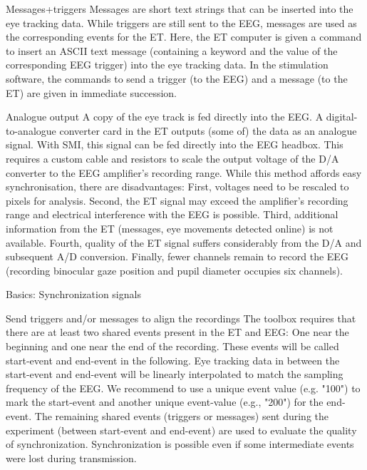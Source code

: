 Messages+triggers
Messages are short text strings that can be inserted into the eye tracking data.
 While triggers are still sent to the EEG, messages are used as the corresponding 
 events for the ET. Here, the ET computer is given a command to insert an ASCII text 
 message (containing a keyword and the value of the corresponding EEG trigger) 
 into the eye tracking data. In the stimulation software, the commands to send a trigger
  (to the EEG) and a message (to the ET) are given in immediate succession. 

  Analogue output
  A copy of the eye track is fed directly into the EEG. A digital-to-analogue 
  converter card in the ET outputs (some of) the data as an analogue signal.
   With SMI, this signal can be fed directly into the EEG headbox. 
   This requires a custom cable and resistors to scale the output voltage 
   of the D/A converter to the EEG amplifier's recording range. While this
    method affords easy synchronisation, there are disadvantages: First, 
    voltages need to be rescaled to pixels for analysis. Second, the ET 
    signal may exceed the amplifier’s recording range and electrical 
    interference with the EEG is possible. 
    Third, additional information from the ET 
    (messages, eye movements detected online) is 
    not available. Fourth, quality of the ET signal 
    suffers considerably from the D/A and subsequent 
    A/D conversion. Finally, fewer channels remain to record
     the EEG (recording binocular gaze position and pupil diameter occupies six channels).

     Basics: Synchronization signals

     Send triggers and/or messages to align the recordings
The toolbox requires that there are at least two shared events present in the ET and EEG: One near the beginning and one near the end of the recording. These events will be called start-event and end-event in the following. Eye tracking data in between the start-event and end-event will be linearly interpolated to match the sampling frequency of the EEG. We recommend to use a unique event value (e.g. "100") to mark the start-event and another unique event-value (e.g., "200") for the end-event. The remaining shared events (triggers or messages) sent during the experiment (between start-event and end-event) are used to evaluate the quality of synchronization. Synchronization is possible even if some intermediate events were lost during transmission.

